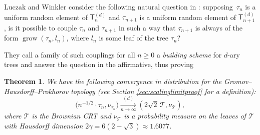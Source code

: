 \documentclass[11pt]{article}
\newcommand{\T}{\mathcal{T}}\let\CRT\T\let\tbr\T
\newcommand{\sT}{\mathsf{T}}
\newcommand{\grow}{\operatorname{grow}}
\newtheorem{thm}{Theorem}[section]
\theoremstyle{definition}
\begin{document}
Luczak and Winkler consider the following natural question in \cite{LW04}: supposing~$\tau_n$ is a uniform random element of $\sT^{(d)}_n$ and $\tau_{n+1}$ is a uniform random element of $\sT^{(d)}_{n+1}$, is it possible to couple $\tau_n$ and $\tau_{n+1}$ in such a way that $\tau_{n+1}$ is always of the form $\grow(\tau_n,l_n)$, where $l_n$ is some leaf of the tree $\tau_n$?

They call a family of such couplings for all $n\geq 0$ a \emph{building scheme} for $d$-ary trees and answer the question in the affirmative, thus proving


\begin{thm}\label{thm:ghpanddim} We have the following convergence in distribution for the Gromov--Hausdorff--Prokhorov topology (see Section \ref{sec:scalinglimitproof} for a definition):\vspace*{-3pt}
\[
\bigl(n^{-1/2} \cdot \tau_n, \nu_{\tau_n} \bigr) \xrightarrow[\textstyle n\to \infty]{\textstyle (d)}(2\sqrt{2}\,\mathcal{T}, \nu_{ \mathcal{T}}),
\]
where $ \mathcal{T}$ is the Brownian CRT and $\nu_{\mathcal{T}}$ is a probability measure on the leaves of $\T$ with Hausdorff dimension $2\gamma= 6(2- \sqrt{3}) \approx 1.6077$.
\end{thm}
\end{document}
